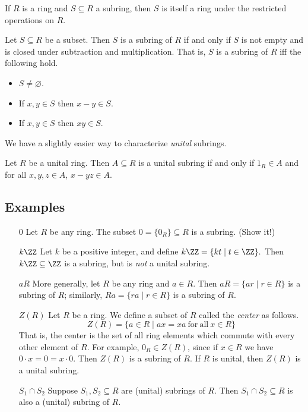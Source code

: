 \documentclass{article}
\begin{document}
\begin{prop}
If $R$ is a ring and $S \subseteq R$ a subring, then $S$ is itself a ring under the restricted operations on $R$.
\end{prop}

\begin{prop}
Let $S \subseteq R$ be a subset. Then $S$ is a subring of $R$ if and only if $S$ is not empty and is closed under subtraction and multiplication. That is, $S$ is a subring of $R$ iff the following hold.
\begin{itemize}
\item $S \neq \varnothing$.
\item If $x,y \in S$ then $x-y \in S$.
\item If $x,y \in S$ then $xy \in S$.
\end{itemize}
\end{prop}

We have a slightly easier way to characterize \emph{unital} subrings.

\begin{prop}
Let $R$ be a unital ring. Then $A \subseteq R$ is a unital subring if and only if $1_R \in A$ and for all $x,y,z \in A$, $x-yz \in A$.
\end{prop}

\subsection*{Examples}

\begin{enumerate}
\item[$0$] Let $R$ be any ring. The subset $0 = \{0_R\} \subseteq R$ is a subring. (Show it!)

\item[$k\ZZ$] Let $k$ be a positive integer, and define $k\ZZ = \{ kt \mid t \in \ZZ \}.$ Then $k\ZZ \subseteq \ZZ$ is a subring, but is \emph{not} a unital subring.

\item[$aR$] More generally, let $R$ be any ring and $a \in R$. Then $aR = \{ ar \mid r \in R \}$ is a subring of $R$; similarly, $Ra = \{ ra \mid r \in R \}$ is a subring of $R$.

\item[$Z(R)$] Let $R$ be a ring. We define a subset of $R$ called the \emph{center} as follows. \[ Z(R) = \{ a \in R \mid ax = xa\ \mathrm{for\ all}\ x \in R \} \] That is, the center is the set of all ring elements which commute with every other element of $R$. For example, $0_R \in Z(R)$, since if $x \in R$ we have $0 \cdot x = 0 = x \cdot 0$. Then $Z(R)$ is a subring of $R$. If $R$ is unital, then $Z(R)$ is a unital subring.

\item[$S_1 \cap S_2$] Suppose $S_1, S_2 \subseteq R$ are (unital) subrings of $R$. Then $S_1 \cap S_2 \subseteq R$ is also a (unital) subring of $R$.
\end{enumerate}
\end{document}

